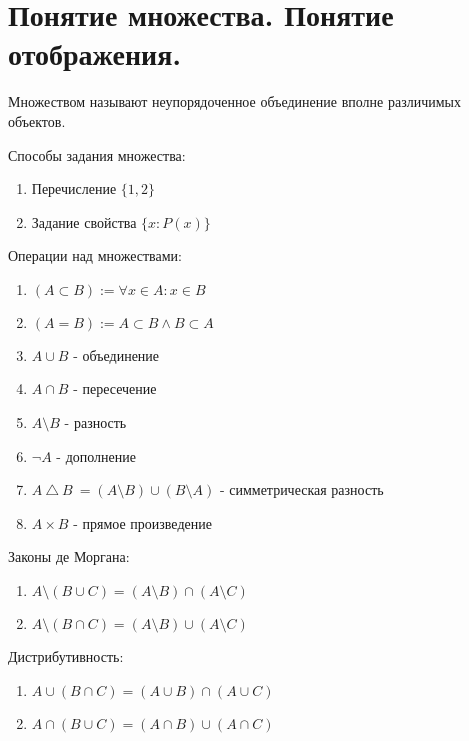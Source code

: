 \documentclass[calculus]{subfiles}
\begin{document}
    \section{Понятие множества. Понятие отображения.}\label{sec:part-1}

    \begin{definition}[Множество]
        Множеством называют неупорядоченное объединение вполне различимых объектов.
    \end{definition}

    \bigskip

    Способы задания множества:
    \begin{enumerate}
        \item Перечисление \(\{1, 2\}\)
        \item Задание свойства \(\{x : P(x)\}\)
    \end{enumerate}

    \bigskip

    Операции над множествами:
    \begin{enumerate}
        \item \((A \subset B) := \forall x \in A : x \in B \)
        \item \((A = B) := A \subset B \land B \subset A\)
        \item \(A \cup B\) - объединение
        \item \(A \cap B\) - пересечение
        \item \(A \setminus B\) - разность
        \item \(\neg A\) - дополнение
        \item \(A \  \triangle \  B\ = (A \setminus B) \cup (B \setminus A) \) - симметрическая разность
        \item \(A \times B\) - прямое произведение
    \end{enumerate}

    \bigskip

    Законы де Моргана:
    \begin{enumerate}
        \item \(A \setminus (B \cup C) = (A \setminus B) \cap (A \setminus C)\)
        \item \(A \setminus (B \cap C) = (A \setminus B) \cup (A \setminus C)\)
    \end{enumerate}

    \bigskip

    Дистрибутивность:
    \begin{enumerate}
        \item \(A \cup (B \cap C) = (A \cup B) \cap (A \cup C) \)
        \item \(A \cap (B \cup C) = (A \cap B) \cup (A \cap C) \)
    \end{enumerate}
\end{document}
